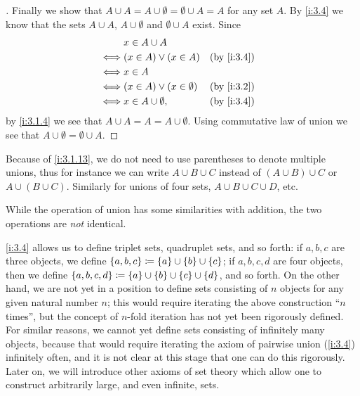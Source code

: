 \begin{proof}[]
  Finally we show that \(A \cup A = A \cup \emptyset = \emptyset \cup A = A\) for any set \(A\).
  By \cref{i:3.4} we know that the sets \(A \cup A\), \(A \cup \emptyset\) and \(\emptyset \cup A\) exist.
  Since
  \begin{align*}
         & x \in A \cup A                                   \\
    \iff & (x \in A) \lor (x \in A)         &  & \by{i:3.4} \\
    \iff & x \in A                                          \\
    \iff & (x \in A) \lor (x \in \emptyset) &  & \by{i:3.2} \\
    \iff & x \in A \cup \emptyset,          &  & \by{i:3.4}
  \end{align*}
  by \cref{i:3.1.4} we see that \(A \cup A = A = A \cup \emptyset\).
  Using commutative law of union we see that \(A \cup \emptyset = \emptyset \cup A\).
\end{proof}

\begin{note}
  Because of \cref{i:3.1.13}, we do not need to use parentheses to denote multiple unions, thus for instance we can write \(A \cup B \cup C\) instead of \((A \cup B) \cup C\) or \(A \cup (B \cup C)\).
  Similarly for unions of four sets, \(A \cup B \cup C \cup D\), etc.
\end{note}

\begin{rmk}\label{i:3.1.14}
  While the operation of union has some similarities with addition, the two operations are \emph{not} identical.
\end{rmk}

\begin{note}
  \cref{i:3.4} allows us to define triplet sets, quadruplet sets, and so forth: if \(a, b, c\) are three objects, we define \(\left\lbrace a, b, c\right\rbrace \coloneqq \left\lbrace a\right\rbrace \cup \left\lbrace b\right\rbrace \cup \left\lbrace c\right\rbrace\);
  if \(a, b, c, d\) are four objects, then we define \(\left\lbrace a, b, c, d\right\rbrace \coloneqq \left\lbrace a\right\rbrace \cup \left\lbrace b\right\rbrace \cup \left\lbrace c\right\rbrace \cup \left\lbrace d\right\rbrace\), and so forth.
  On the other hand, we are not yet in a position to define sets consisting of \(n\) objects for any given natural number \(n\);
  this would require iterating the above construction ``\(n\) times'', but the concept of \(n\)-fold iteration has not yet been rigorously defined.
  For similar reasons, we cannot yet define sets consisting of infinitely many objects, because that would require iterating the axiom of pairwise union (\cref{i:3.4}) infinitely often, and it is not clear at this stage that one can do this rigorously.
  Later on, we will introduce other axioms of set theory which allow one to construct arbitrarily large, and even infinite, sets.
\end{note}


